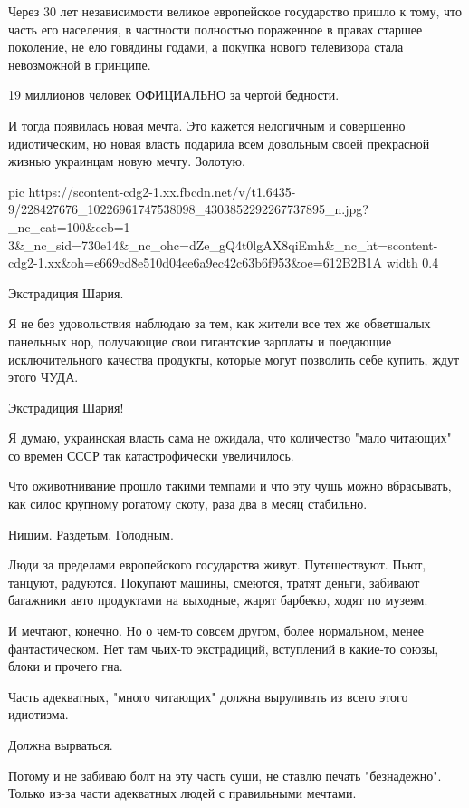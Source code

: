 Через 30 лет независимости великое европейское государство пришло  к тому, что
часть его населения, в частности полностью пораженное в правах старшее
поколение, не ело говядины годами, а покупка нового телевизора стала
невозможной в принципе. 

19 миллионов человек ОФИЦИАЛЬНО за чертой бедности. 

И тогда появилась новая мечта. Это кажется нелогичным и совершенно
идиотическим, но новая власть подарила всем довольным своей прекрасной жизнью
украинцам новую мечту. Золотую. 

\ifcmt
  pic https://scontent-cdg2-1.xx.fbcdn.net/v/t1.6435-9/228427676_10226961747538098_4303852292267737895_n.jpg?_nc_cat=100&ccb=1-3&_nc_sid=730e14&_nc_ohc=dZe_gQ4t0lgAX8qiEmh&_nc_ht=scontent-cdg2-1.xx&oh=e669cd8e510d04ee6a9ec42c63b6f953&oe=612B2B1A
  width 0.4
\fi

Экстрадиция Шария.

Я не без удовольствия наблюдаю за тем, как жители все тех же обветшалых
панельных нор, получающие свои гигантские зарплаты и поедающие исключительного
качества продукты, которые могут позволить себе купить, ждут этого ЧУДА.

Экстрадиция Шария! 

Я думаю, украинская власть сама не ожидала, что количество "мало читающих" со
времен СССР так катастрофически увеличилось. 

Что оживотнивание прошло такими темпами и что эту чушь можно вбрасывать, как
силос крупному рогатому скоту, раза два в месяц стабильно. 

Нищим. Раздетым. Голодным. 

Люди за пределами европейского государства живут. Путешествуют. Пьют, танцуют,
радуются. Покупают машины, смеются, тратят деньги, забивают багажники авто
продуктами на выходные, жарят барбекю, ходят по музеям. 

И мечтают, конечно. Но о чем-то совсем другом, более нормальном, менее
фантастическом. Нет там чьих-то экстрадиций, вступлений в какие-то союзы, блоки
и прочего гна. 

Часть адекватных, "много читающих" должна выруливать из всего этого идиотизма.

Должна вырваться. 

Потому и не забиваю болт на эту часть суши, не ставлю печать "безнадежно".
Только из-за части адекватных людей с правильными мечтами.

